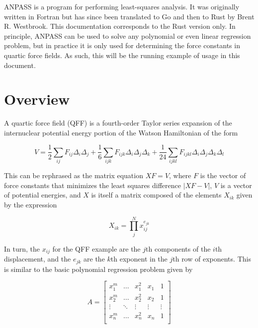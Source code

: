 \documentclass{article}
\begin{document}
ANPASS is a program for performing least-squares analysis. It was originally
written in Fortran but has since been translated to Go and then to Rust by Brent
R. Westbrook. This documentation corresponds to the Rust version only. In
principle, ANPASS can be used to solve any polynomial or even linear regression
problem, but in practice it is only used for determining the force constants in
quartic force fields. As such, this will be the running example of usage in this
document.

\section{Overview}

A quartic force field (QFF) is a fourth-order Taylor series expansion of the
internuclear potential energy portion of the Watson Hamiltonian of the form

\begin{equation}
  V = \frac{1}{2}\sum_{ij} F_{ij}\Delta_i\Delta_j +
  \frac{1}{6}\sum_{ijk} F_{ijk}\Delta_i\Delta_j \Delta_k+
  \frac{1}{24}\sum_{ijkl} F_{ijkl}\Delta_i\Delta_j\Delta_k\Delta_l
\end{equation}

This can be rephrased as the matrix equation $XF=V$, where $F$ is the vector of
force constants that minimizes the least squares difference $|XF - V|$, $V$ is a
vector of potential energies, and $X$ is itself a matrix composed of the
elements $X_{ik}$ given by the expression

\begin{equation}
  X_{ik} = \prod_j^N x_{ij}^{e_{jk}}
\end{equation}

In turn, the $x_{ij}$ for the QFF example are the $j$th components of the $i$th
displacement, and the $e_{jk}$ are the $k$th exponent in the $j$th row of
exponents. This is similar to the basic polynomial regression problem given by

\begin{equation}
  A =
  \begin{bmatrix}
    x_1^m & \dots & x_1^2 & x_1 & 1 \\
    x_2^m & \dots & x_2^2 & x_2 & 1 \\
    \vdots & \ddots & \vdots & \vdots & \vdots \\
    x_n^m & \dots & x_n^2 & x_n & 1 \\
  \end{bmatrix}
\end{equation}
\end{document}
